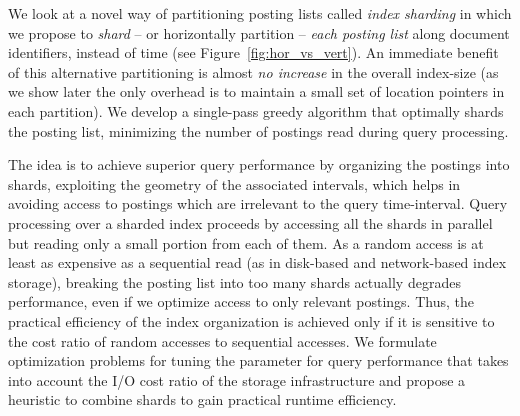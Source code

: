 
We look at a novel way of partitioning posting lists called \emph{index sharding} in which we propose to \emph{shard} -- or horizontally partition -- \emph{each posting list} along document identifiers, instead of time (see Figure~\ref{fig:hor_vs_vert}). 
An immediate benefit of this alternative partitioning is almost \emph{no increase} in the overall
index-size (as we show later the only overhead is to maintain a small set of location pointers in each partition). We develop a single-pass
greedy algorithm that optimally shards the posting list, minimizing the
number of postings read during query processing.

The idea is to achieve superior query performance by organizing the postings into shards, exploiting the geometry of the associated intervals, which helps in avoiding access to postings which are irrelevant to the query time-interval. Query processing over a sharded index proceeds by accessing all 
the shards in parallel but reading only a small portion from each of them. As a random access is at least as expensive as a 
sequential read (as in disk-based and network-based index storage), breaking 
the posting list into too many shards actually degrades performance, even if we optimize access to only relevant postings. Thus, the practical 
efficiency of the index organization is achieved only if it is 
sensitive to the cost ratio of random accesses to sequential accesses. 
We formulate optimization problems for tuning the parameter for 
query performance that takes into account the I/O cost ratio of the 
storage infrastructure and propose a heuristic to combine shards to 
gain practical runtime efficiency. 



